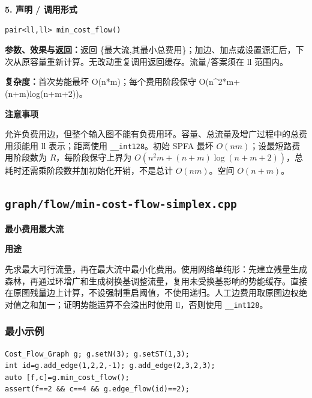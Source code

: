 \documentclass[UTF8,a4paper,10pt]{ctexart}
\newcommand{\TemplUsage}[1]{\textbf{用途}\par #1\par}
\newcommand{\TemplNote}[1]{\textbf{注意事项}\par #1\par}
\begin{document}
\noindent\begin{minipage}{\textwidth}
\textbf{5. 声明 / 调用形式}
\begin{lstlisting}
pair<ll,ll> min_cost_flow()
\end{lstlisting}
\textbf{参数、效果与返回：}返回 \{最大流,其最小总费用\}；加边、加点或设置源汇后，下次从原容量重新计算。无改动重复调用返回缓存。流量/答案须在 ll 范围内。

\textbf{复杂度：}首次势能最坏 O(n*m)；每个费用阶段保守 O(n\textasciicircum{}2*m+(n+m)log(n+m+2))。

\TemplNote{允许负费用边，但整个输入图不能有负费用环。容量、总流量及增广过程中的总费用须能用 ll 表示；距离使用 \texttt{\_\_int128}。初始 SPFA 最坏 $O(nm)$；设最短路费用阶段数为 $R$，每阶段保守上界为 $O(n^2m+(n+m)\log(n+m+2))$，总耗时还需乘阶段数并加初始化开销，不是总计 $O(nm)$。空间 $O(n+m)$。}
\end{minipage}\par\vspace{0.4em}
\clearpage
\subsection{\texttt{graph/flow/min-cost-flow-simplex.cpp}}
\textbf{最小费用最大流}\par
\TemplUsage{先求最大可行流量，再在最大流中最小化费用。使用网络单纯形：先建立残量生成森林，再通过环增广和生成树换基调整流量，复用未受换基影响的势能缓存。直接在原图残量边上计算，不设强制重启阈值，不使用递归。人工边费用取原图边权绝对值之和加一；证明势能运算不会溢出时使用 ll，否则使用 \texttt{\_\_int128}。}
\subsubsection*{最小示例}
\begin{lstlisting}
Cost_Flow_Graph g; g.setN(3); g.setST(1,3);
int id=g.add_edge(1,2,2,-1); g.add_edge(2,3,2,3);
auto [f,c]=g.min_cost_flow();
assert(f==2 && c==4 && g.edge_flow(id)==2);
\end{lstlisting}
\end{document}
